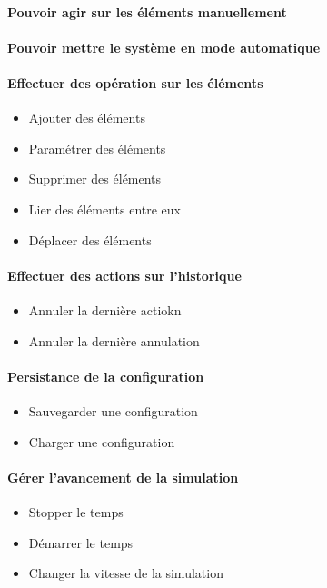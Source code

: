 {
	\paragraph{ Pouvoir agir sur les éléments manuellement}
	\paragraph{ Pouvoir mettre le système en mode automatique}
}
{
\paragraph{Effectuer des opération sur les éléments }
\begin{itemize}
	\item Ajouter des éléments
	\item Paramétrer des éléments
	\item Supprimer des éléments
	\item Lier des éléments entre eux
	\item Déplacer des éléments
\end{itemize}

\paragraph{Effectuer des actions sur l'historique}
\begin{itemize}
	\item Annuler la dernière actiokn
	\item Annuler la dernière annulation
\end{itemize}

\paragraph{Persistance de la configuration}
\begin{itemize}
	\item Sauvegarder une configuration
	\item Charger une configuration
\end{itemize}

\paragraph{Gérer l'avancement de la simulation}
\begin{itemize}
	\item Stopper le temps
	\item Démarrer le temps
	\item Changer la vitesse de la simulation
\end{itemize}

}
